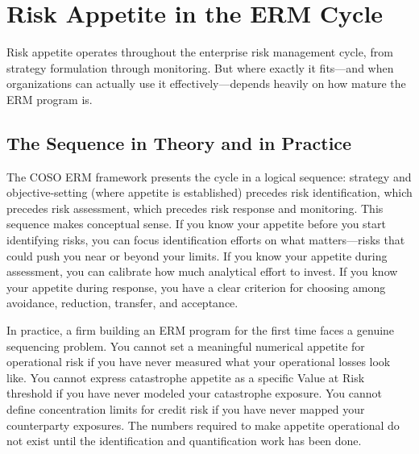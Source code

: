 \documentclass[11pt,openany]{book}
\begin{document}
\section{Risk Appetite in the ERM Cycle}
\label{sec:appetite-erm-cycle}

Risk appetite operates throughout the enterprise risk management cycle, from
strategy formulation through monitoring. But where exactly it fits---and when
organizations can actually use it effectively---depends heavily on how mature
the ERM program is.

\subsection{The Sequence in Theory and in Practice}
\label{subsec:sequence-theory-practice}

The COSO ERM framework presents the cycle in a logical sequence: strategy and
objective-setting (where appetite is established) precedes risk identification,
which precedes risk assessment, which precedes risk response and monitoring.
This sequence makes conceptual sense. If you know your appetite before you start
identifying risks, you can focus identification efforts on what matters---risks
that could push you near or beyond your limits. If you know your appetite during
assessment, you can calibrate how much analytical effort to invest. If you know
your appetite during response, you have a clear criterion for choosing among
avoidance, reduction, transfer, and acceptance.

In practice, a firm building an ERM program for the first time faces a genuine
sequencing problem. You cannot set a meaningful numerical appetite for
operational risk if you have never measured what your operational losses look
like. You cannot express catastrophe appetite as a specific Value at Risk
threshold if you have never modeled your catastrophe exposure. You cannot define
concentration limits for credit risk if you have never mapped your counterparty
exposures. The numbers required to make appetite operational do not exist until
the identification and quantification work has been done.
\end{document}
